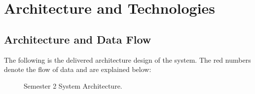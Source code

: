 \chapter{Architecture and Technologies}
\label{chap:architecture}

\section{Architecture and Data Flow}
\label{sec:architecture}
The following is the delivered architecture design of the system. The red numbers denote the flow of data
and are explained below:
\begin{figure}[H]
	\centering
	\caption{Semester 2 System Architecture.}
	\label{fig:delivered_archi}
\end{figure}

